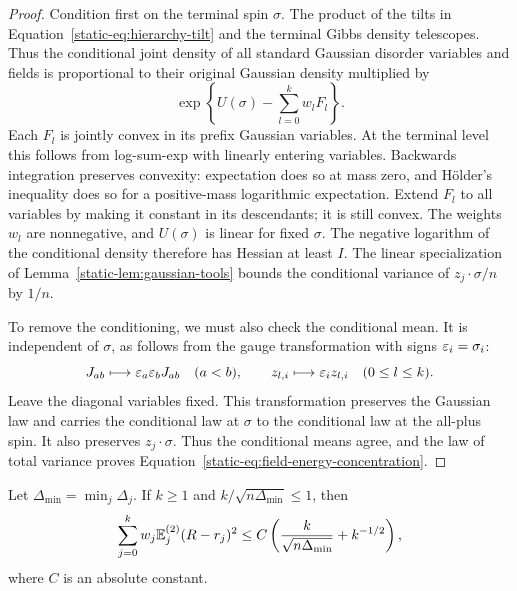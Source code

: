 \begin{proof}
Condition first on the terminal spin $\sigma$. The product of the
tilts in Equation~\eqref{static-eq:hierarchy-tilt} and the terminal
Gibbs density telescopes. Thus the conditional joint density of all
standard Gaussian disorder variables and fields is proportional to
their original Gaussian density multiplied by
\begin{equation}\label{static-eq:fixed-spin-density}
 \exp\left\{U(\sigma)-\sum_{l=0}^kw_lF_l\right\}.
\end{equation}
Each $F_l$ is jointly convex in its prefix Gaussian variables. At the
terminal level this follows from log-sum-exp with linearly entering
variables. Backwards integration preserves convexity: expectation does
so at mass zero, and H\"older's inequality does so for a positive-mass
logarithmic expectation. Extend $F_l$ to all variables by making it
constant in its descendants; it is still convex. The weights $w_l$
are nonnegative, and $U(\sigma)$ is linear for fixed $\sigma$.
The negative logarithm of the conditional density therefore has Hessian
at least $I$. The linear specialization of
Lemma~\ref{static-lem:gaussian-tools} bounds the conditional variance
of $z_j\cdot\sigma/n$ by $1/n$.

To remove the conditioning, we must also check the conditional mean.
It is independent of $\sigma$, as follows from the gauge transformation
with signs $\varepsilon_i=\sigma_i$:
\[
 J_{ab}\longmapsto\varepsilon_a\varepsilon_bJ_{ab}\quad(a<b),
 \qquad z_{l,i}\longmapsto\varepsilon_i z_{l,i}\quad(0\le l\le k).
\]
Leave the diagonal variables fixed. This transformation preserves the
Gaussian law and carries the conditional law at $\sigma$ to the
conditional law at the all-plus spin. It also preserves
$z_j\cdot\sigma$. Thus the conditional means agree, and the law of
total variance proves Equation~\eqref{static-eq:field-energy-concentration}.
\end{proof}

\begin{lemma}\label{static-lem:average-overlap}
Let $\Delta_{\min}=\min_j\Delta_j$.  If $k\ge1$ and
$k/\sqrt{n\Delta_{\min}}\le1$, then
\begin{equation}\label{static-eq:average-overlap-concentration}
 \sum_{j=0}^kw_j\mathbb E_j^{(2)}(R-r_j)^2
 \le C\left(\frac{k}{\sqrt{n\Delta_{\min}}}+k^{-1/2}\right),
\end{equation}
where $C$ is an absolute constant.
\end{lemma}

